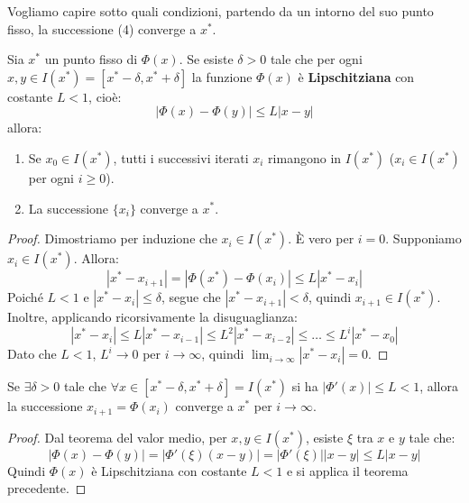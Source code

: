 Vogliamo capire sotto quali condizioni, partendo da un intorno del suo punto fisso, la successione (4) converge a $x^*$.

\begin{teorema}
Sia $x^*$ un punto fisso di $\Phi(x)$. Se esiste $\delta > 0$ tale che per ogni $x, y \in I(x^*) = [x^*-\delta, x^*+\delta]$ la funzione $\Phi(x)$ è \textbf{Lipschitziana} con costante $L < 1$, cioè:
$$ |\Phi(x) - \Phi(y)| \le L |x - y| $$
allora:
\leavevmode %
\begin{enumerate}
    \item Se $x_0 \in I(x^*)$, tutti i successivi iterati $x_i$ rimangono in $I(x^*)$ ($x_i \in I(x^*)$ per ogni $i \ge 0$).
    \item La successione $\{x_i\}$ converge a $x^*$.
\end{enumerate}
\end{teorema}
\begin{proof}
Dimostriamo per induzione che $x_i \in I(x^*)$. È vero per $i=0$. Supponiamo $x_i \in I(x^*)$. Allora:
$$ |x^* - x_{i+1}| = |\Phi(x^*) - \Phi(x_i)| \le L |x^* - x_i| $$
Poiché $L<1$ e $|x^* - x_i| \le \delta$, segue che $|x^* - x_{i+1}| < \delta$, quindi $x_{i+1} \in I(x^*)$.
Inoltre, applicando ricorsivamente la disuguaglianza:
$$ |x^* - x_i| \le L |x^* - x_{i-1}| \le L^2 |x^* - x_{i-2}| \le \dots \le L^i |x^* - x_0| $$
Dato che $L<1$, $L^i \to 0$ per $i \to \infty$, quindi $\lim_{i \to \infty} |x^* - x_i| = 0$.
\end{proof}

\begin{corollario}
    Se $\exists \delta > 0$ tale che $\forall x \in [x^*-\delta, x^*+\delta] = I(x^*)$ si ha $|\Phi'(x)| \le L < 1$, allora la successione $x_{i+1} = \Phi(x_i)$ converge a $x^*$ per $i \to \infty$.
\end{corollario}
\begin{proof}
Dal teorema del valor medio, per $x, y \in I(x^*)$, esiste $\xi$ tra $x$ e $y$ tale che:
$$ |\Phi(x) - \Phi(y)| = |\Phi'(\xi)(x-y)| = |\Phi'(\xi)| |x-y| \le L |x-y| $$
Quindi $\Phi(x)$ è Lipschitziana con costante $L<1$ e si applica il teorema precedente.
\end{proof}

